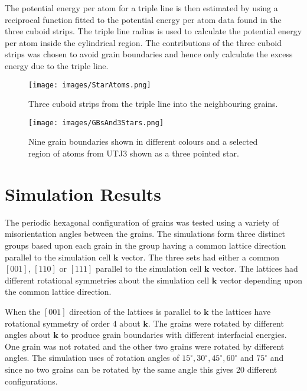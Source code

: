 \documentclass[12pt,a4paper]{book}
\begin{document}
The potential energy per atom for a triple line is then estimated by using a reciprocal function fitted to the potential energy per atom data found in the three cuboid strips. The triple line radius is used to calculate the potential energy per atom inside the cylindrical region. The contributions of the three cuboid strips was chosen to avoid grain boundaries and hence only calculate the excess energy due to the triple line.  

\begin{figure}
	\texttt{[image: images/StarAtoms.png]} 
	\label{fig:StarAtoms}
	\caption{Three cuboid strips from the triple line into the
	neighbouring grains.}
\end{figure}


\begin{figure}
	\texttt{[image: images/GBsAnd3Stars.png]} 
	\label{fig:GBsandStar}
	\caption{Nine grain boundaries shown in different colours and a selected region of atoms from UTJ3 shown as a three pointed star.}
	   
\end{figure}


\chapter{Simulation Results} \label{sec:SimulationResults}

The periodic hexagonal configuration of grains was tested using a variety of misorientation angles between the grains.  The simulations form three distinct groups based upon each grain in the group having a common lattice direction parallel to the simulation cell $\mathbf{k}$ vector. The three sets had either a common $[0 0 1]$, $[1 1 0]$ or $[1 1 1]$ parallel to the simulation cell $\mathbf{k}$ vector. The lattices had different rotational symmetries about the simulation cell $\mathbf{k}$ vector depending upon the common lattice direction.

When the $[0 0 1]$ direction of the lattices is parallel to $\mathbf{k}$ the lattices have rotational symmetry of order 4 about $\mathbf{k}$.  The grains were rotated by different angles about $\mathbf{k}$ to produce grain boundaries with different interfacial energies. One grain was not rotated and the other two grains were rotated by different angles. The simulation uses of rotation angles of $15^{\circ},30^{\circ},45^{\circ},60^{\circ}$ and $75^{\circ}$ and since no two grains can be rotated by the same angle this gives 20 different configurations.
\end{document}
